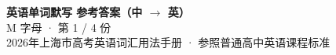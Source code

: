 \documentclass[10pt,a4paper]{article}
\begin{document}
\pagestyle{plain}

\begin{center}
{\LARGE\bfseries 英语单词默写 \quad 参考答案（中 $\to$ 英）}\\[0.22em]
{\large M 字母 · 第 1 / 4 份}\\[0.18em]
{\small 2026年上海市高考英语词汇用法手册 · 参照普通高中英语课程标准}
\end{center}

\vspace{0.2em}
\noindent{\color{rulegray}\rule{\textwidth}{0.8pt}}

\vspace{0.35em}

\vspace{0.25em}
\renewcommand{\arraystretch}{1.32}
\end{document}
